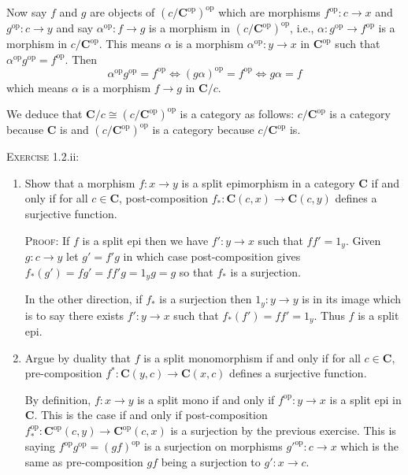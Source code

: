 \documentclass{article}
\newcommand{\op}{\textrm{op}}
\begin{document}
Now say \(f\) and \(g\) are objects of \((c/\mathbf{C}^\op)^\op\) which are morphisms \(f^\op:c→x\) and \(g^\op:c→y\) and say \(α^\op:f→g\) is a morphism in \((c/\mathbf{C}^\op)^\op\), i.e., \(α:g^\op→f^\op\) is a morphism in \(c/\mathbf{C}^\op\). This means \(α\) is a morphism \(α^\op:y→x\) in \(\mathbf{C}^\op\) such that \(α^\op g^\op=f^\op\). Then
\begin{equation*}
α^\op g^\op=f^\op ⇔ (gα)^\op = f^\op ⇔ gα=f
\end{equation*}
which means \(α\) is a morphism \(f→g\) in \(\mathbf{C}/c\).

We deduce that \(\mathbf{C}/c≅(c/\mathbf{C}^\op)^\op\) is a category as follows: \(c/\mathbf{C}^\op\) is a category because \(\mathbf{C}\) is and \((c/\mathbf{C}^\op)^\op\) is a category because \(c/\mathbf{C}^\op\) is.
\vspace{8pt}

\noindent
\textsc{Exercise} 1.2.ii:
\begin{enumerate}
\item Show that a morphism \(f:x→y\) is a split epimorphism in a category \textbf{C} if and only if for all \(c∈\mathbf{C}\), post-composition \(f_*:\mathbf{C}(c,x)→ \mathbf{C}(c,y)\) defines a surjective function.
\vspace{5pt}

\textsc{Proof:} If \(f\) is a split epi then we have \(f':y→x\) such that \(ff'=1_y\). Given \(g:c→y\) let \(g'=f'g\) in which case post-composition gives \(f_*(g') = fg'=ff'g=1_yg=g\) so that \(f_*\) is a surjection.

In the other direction, if \(f_*\) is a surjection then \(1_y:y→y\) is in its image which is to say there exists \(f':y→x\) such that \(f_*(f') = ff'=1_y\). Thus \(f\) is a split epi.

\item Argue by duality that \(f\) is a split monomorphism if and only if for all \(c∈\mathbf{C}\), pre-composition \(f^*:\mathbf{C}(y,c)→ \mathbf{C}(x,c)\) defines a surjective function.
\vspace{5pt}

By definition, \(f:x→y\) is a split mono if and only if \(f^\op:y→x\) is a split epi in \textbf{C}. This is the case if and only if post-composition \(f^\op_*:\mathbf{C}^\op(c, y)→\mathbf{C}^\op(c, x)\) is a surjection by the previous exercise. This is saying \(f^\op g^\op = (gf)^\op\) is a surjection on morphisms \(g'^\op:c→x\) which is the same as pre-composition \(gf\) being a surjection to \(g':x→c\).
\end{enumerate}
\end{document}
